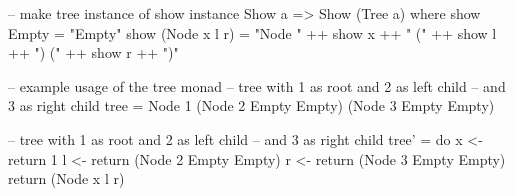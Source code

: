 \documentclass[a4paper,landscape,10pt]{article}
\begin{document}
\begin{multicols*}{2}
\begin{haskell}
-- make tree instance of show
  instance Show a => Show (Tree a) where
  show Empty = "Empty"
  show (Node x l r) = "Node " ++ show x ++ " (" ++ show l ++ ") (" ++ show r ++ ")"
\end{haskell}

  \breakcolumn

  \begin{haskell}
-- example usage of the tree monad
-- tree with 1 as root and 2 as left child
-- and 3 as right child
tree = Node 1 (Node 2 Empty Empty) (Node 3 Empty Empty)

-- tree with 1 as root and 2 as left child
-- and 3 as right child
tree' = do
  x <- return 1
  l <- return (Node 2 Empty Empty)
  r <- return (Node 3 Empty Empty)
  return (Node x l r)
  \end{haskell}

\end{multicols*}

\clearpage
\end{document}
